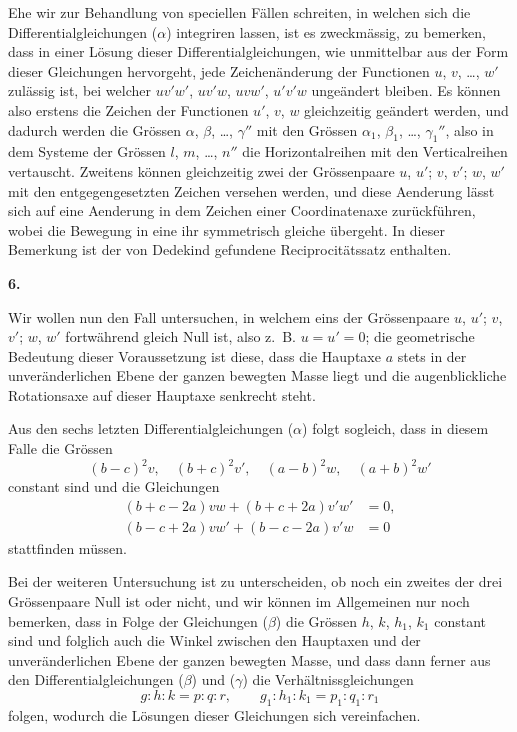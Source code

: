 \documentclass[12pt,a4paper]{article}
\begin{document}
Ehe wir zur Behandlung von speciellen F\"allen schreiten, in welchen sich die Differentialgleichungen ($\alpha$) integriren lassen, ist es zweckm\"assig, zu bemerken, dass in einer L\"osung dieser Differentialgleichungen, wie unmittelbar aus der Form dieser Gleichungen hervorgeht, jede Zeichen\"anderung der Functionen $u$, $v$, \dots, $w'$ zul\"assig ist, bei welcher $uv'w'$, $uv'w$, $uvw'$, $u'v'w$ unge\"andert bleiben. Es k\"onnen also erstens die Zeichen der Functionen $u'$, $v$, $w$ gleichzeitig ge\"andert werden, und dadurch werden die Gr\"ossen $\alpha$, $\beta$, \dots, $\gamma''$ mit den Gr\"ossen $\alpha_{1}$, $\beta_{1}$, \dots, $\gamma_{1}''$, also in dem Systeme der Gr\"ossen $l$, $m$, \dots, $n''$ die Horizontalreihen mit den Verticalreihen vertauscht. Zweitens k\"onnen gleichzeitig zwei der Gr\"ossenpaare $u$, $u'$; $v$, $v'$; $w$, $w'$ mit den entgegengesetzten Zeichen versehen werden, und diese Aenderung l\"asst sich auf eine Aenderung in dem Zeichen einer Coordinatenaxe zur\"uckf\"uhren, wobei die Bewegung in eine ihr symmetrisch gleiche \"ubergeht. In dieser Bemerkung ist der von Dedekind gefundene Reciprocit\"atssatz enthalten.

\begin{center}
\textbf{6.}
\end{center}

Wir wollen nun den Fall untersuchen, in welchem eins der Gr\"ossenpaare $u$, $u'$; $v$, $v'$; $w$, $w'$ fortw\"ahrend gleich Null ist, also z.~B. $u = u' = 0$; die geometrische Bedeutung dieser Voraussetzung ist diese, dass die Hauptaxe $a$ stets in der unver\"anderlichen Ebene der ganzen bewegten Masse liegt und die augenblickliche Rotationsaxe auf dieser Hauptaxe senkrecht steht.

Aus den sechs letzten Differentialgleichungen ($\alpha$) folgt sogleich, dass in diesem Falle die Gr\"ossen
\begin{equation*}
(b - c)^{2}v,\quad (b + c)^{2}v',\quad (a - b)^{2}w,\quad (a + b)^{2}w'\tag{$\beta$}
\end{equation*}
constant sind und die Gleichungen
\begin{align*}
(b + c - 2a)vw + (b + c + 2a)v'w' &= 0,\\
(b - c + 2a)vw' + (b - c - 2a)v'w &= 0\tag{$\gamma$}
\end{align*}
stattfinden m\"ussen.

Bei der weiteren Untersuchung ist zu unterscheiden, ob noch ein zweites der drei Gr\"ossenpaare Null ist oder nicht, und wir k\"onnen im Allgemeinen nur noch bemerken, dass in Folge der Gleichungen ($\beta$) die Gr\"ossen $h$, $k$, $h_{1}$, $k_{1}$ constant sind und folglich auch die Winkel zwischen den Hauptaxen und der unver\"anderlichen Ebene der ganzen bewegten Masse, und dass dann ferner aus den Differentialgleichungen ($\beta$) und ($\gamma$) die Verh\"altnissgleichungen
\[
g : h : k = p : q : r,\qquad g_{1} : h_{1} : k_{1} = p_{1} : q_{1} : r_{1}
\]
folgen, wodurch die L\"osungen dieser Gleichungen sich vereinfachen.
\end{document}
